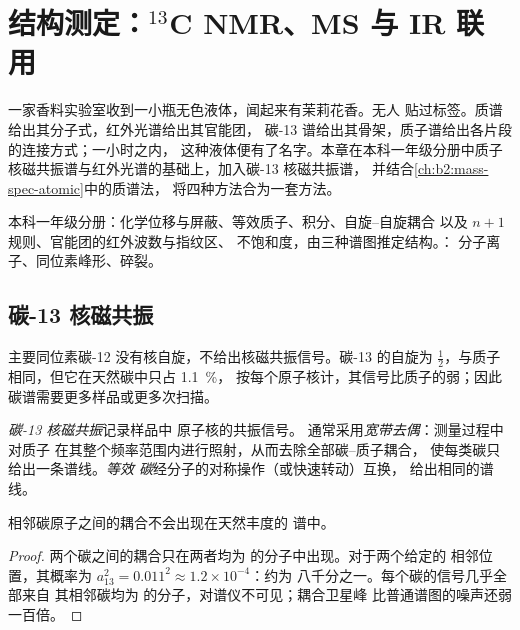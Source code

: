 \chapter{结构测定：\texorpdfstring{$^{13}$C}{13C} NMR、MS 与 IR 联用}\label{ch:b2:structure-determination}

一家香料实验室收到一小瓶无色液体，闻起来有茉莉花香。无人
贴过标签。质谱给出其分子式，红外光谱给出其官能团，
碳-13 谱给出其骨架，质子谱给出各片段的连接方式；一小时之内，
这种液体便有了名字。本章在本科一年级分册中质子核磁共振谱与红外光谱的基础上，加入碳-13 核磁共振谱，
并结合\cref{ch:b2:mass-spec-atomic}中的质谱法，
将四种方法合为一套方法。

\begin{recall}
本科一年级分册：化学位移与屏蔽、等效质子、积分、自旋–自旋耦合
以及 $n + 1$ 规则、官能团的红外波数与指纹区、
不饱和度，由三种谱图推定结构。：
分子离子、同位素峰形、碎裂。
\end{recall}

\section{碳-13 核磁共振}

主要同位素碳-12 没有核自旋，不给出核磁共振信号。碳-13 的自旋为
$\tfrac12$，与质子相同，但它在天然碳中只占 1.1~\%，
按每个原子核计，其信号比质子的弱；因此碳谱需要更多样品或更多次扫描。

\begin{definition}[碳-13 核磁共振]\label{def:b2:structure-determination:c13}
\emph{碳-13 核磁共振}记录样品中  原子核的共振信号。
通常采用\emph{宽带去偶}：测量过程中对质子
在其整个频率范围内进行照射，从而去除全部碳–质子耦合，
使每类碳只给出一条谱线。\emph{等效
碳}经分子的对称操作（或快速转动）互换，
给出相同的谱线。
\end{definition}

\begin{proposition}[无碳–碳耦合]\label{prop:b2:structure-determination:no-cc-coupling}
相邻碳原子之间的耦合不会出现在天然丰度的
 谱中。
\end{proposition}

\begin{proof}
两个碳之间的耦合只在两者均为  的分子中出现。对于两个给定的
相邻位置，其概率为 $a_{13}^2 = 0.011^2 \approx 1.2 \times 10^{-4}$：约为
八千分之一。每个碳的信号几乎全部来自
其相邻碳均为  的分子，对谱仪不可见；耦合卫星峰
比普通谱图的噪声还弱一百倍。
\end{proof}

